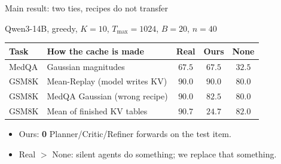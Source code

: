 \documentclass[aspectratio=169]{beamer}
\begin{document}
\begin{frame}{Main result: two ties, recipes do not transfer}
\begin{center}
\small Qwen3-14B, greedy, $K{=}10$, $T_{\max}{=}1024$, $B{=}20$, $n{=}40$
\end{center}
\begin{center}
\begin{tabular}{llccc}
\toprule
Task & How the cache is made & Real & Ours & None \\
\midrule
MedQA & Gaussian magnitudes & $67.5$ & $\mathbf{67.5}$ & $32.5$ \\
GSM8K & Mean-Replay (model writes KV) & $90.0$ & $\mathbf{90.0}$ & $80.0$ \\
GSM8K & MedQA Gaussian (wrong recipe) & $90.0$ & $82.5$ & $80.0$ \\
GSM8K & Mean of finished KV tables & $90.7$ & $24.7$ & $82.0$ \\
\bottomrule
\end{tabular}
\end{center}
\vspace{0.45em}
\begin{itemize}
  \item Ours: \textbf{0} Planner/Critic/Refiner forwards on the test item.
  \item Real $>$ None: silent agents do something; we replace that something.
\end{itemize}
\end{frame}
\end{document}

